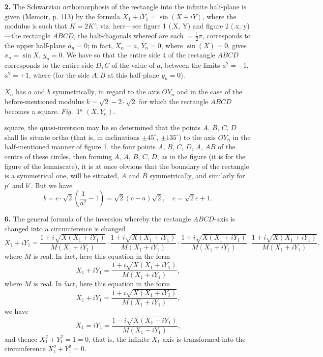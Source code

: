 \documentclass[11pt,a4paper]{book}
\begin{document}
\textbf{2.} The Schwarzian orthomorphosis of the rectangle into the infinite half-plane is given (Memoir, p. 113) by the formula $X_1 + iY_1 = \sin (X + iY)$, where the modulus is such that $K = 2K'$; viz. here---see figure 1 (.X, Y) and figure 2 (.x, y)---the rectangle $ABCD$, the half-diagonals whereof are each $= \frac{1}{2}\pi$, corresponds to the upper half-plane $a_n = 0$; in fact, $X_n = a$, $Y_n = 0$, where $\sin(X) = 0$, gives $x_n = \sin X$, $y_n = 0$. We have so that the entire side $4$ of the rectangle $ABCD$ corresponds to the entire side $D, C$ of the value of $a$, between the limits $a^2 = - 1$, $a^2 = + 1$, where (for the side $A, B$ at this half-plane $y_n = 0$).

$X_n$ has $a$ and $b$ symmetrically, in regard to the axis $OY_n$ and in the case of the before-mentioned modulus $k = \sqrt{2} - 2 \cdot \sqrt{2}$ for which the rectangle $ABCD$ becomes a square. \textit{Fig.}\ 1$^a$ $(X, Y_n)$.

square, the quasi-inversion may be so determined that the points $A$, $B$, $C$, $D$ shall lie situate ortho (that is, in inclinations $\pm 45^\circ$, $\pm 135^\circ$) to the axis $OY_n$ in the half-mentioned manner of figure 1, the four points $A$, $B$, $C$, $D$, $A$, $A B$ of the centre of these circles, then forming $A$, $A$, $B$, $C$, $D$, as in the figure (it is for the figure of the lemniscate), it is at once obvious that the boundary of the rectangle is a symmetrical one, will be situated, $A$ and $B$ symmetrically, and similarly for $p'$ and $b'$. But we have
\[
b = c \cdot \sqrt{2}\left(\frac{1}{a^2} - 1\right) = \sqrt{2}(c - a)\sqrt{2}, \quad c = \sqrt{2}c + 1,
\]

\textbf{6.} The general formula of the inversion whereby the rectangle $ABCD$-axis is changed into a circumference is changed
\[
X_1 + iY_1 = \frac{1 + i\sqrt{X(X_1 + iY_1)}}{M(X_1 + iY_1)} \cdot \frac{1 + i\sqrt{X(X_1 + iY_1)}}{M(X_1 + iY_1)} \cdot \frac{1 + i\sqrt{X(X_1 + iY_1)}}{M(X_1 + iY_1)} \cdot \frac{1 + i\sqrt{X(X_1 + iY_1)}}{M(X_1 + iY_1)},
\]
where $M$ is real. In fact, here this equation in the form
\[
X_1 + iY_1 = \frac{1 + i\sqrt{X(X_1 + iY_1)}}{M(X_1 + iY_1)},
\]
where $M$ is real. In fact, here this equation in the form
\[
X_1 + iY_1 = \frac{1 + i\sqrt{X(X_1 + iY_1)}}{M(X_1 + iY_1)},
\]
we have
\[
X_1 = iY_1 = \frac{1 - i\sqrt{X(X_1 - iY_1)}}{M(X_1 - iY_1)},
\]
and thence $X_1^2 + Y_1^2 = 1 = 0$, that is, the infinite $X_1$-axis is transformed into the circumference $X_1^2 + Y_1^2 = 0$.
\end{document}
